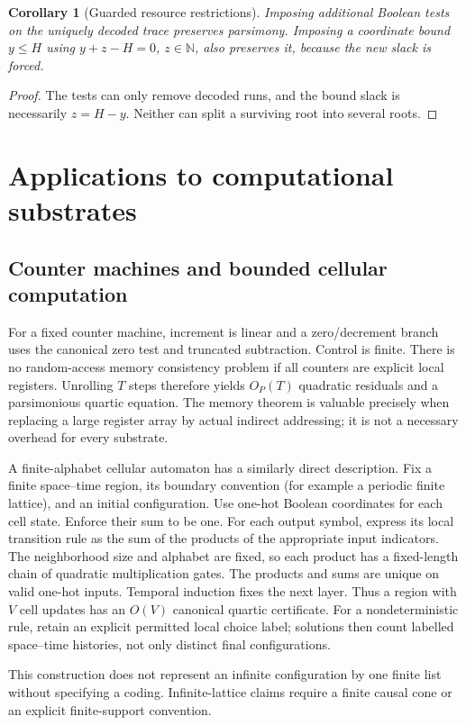 \documentclass[11pt,a4paper]{article}
\newtheorem{corollary}[corollary]{Corollary}
\theoremstyle{definition}
\theoremstyle{remark}
\newcommand{\N}{\mathbb N}
\newcommand{\srctag}[1]{\texorpdfstring{\hspace{0.5em}{\normalfont\small\color{accent}[#1]}}{ [#1]}}
\begin{document}
\begin{corollary}[Guarded resource restrictions]
Imposing additional Boolean tests on the uniquely decoded trace preserves
parsimony. Imposing a coordinate bound $y\leq H$ using
$y+z-H=0$, $z\in\N$, also preserves it, because the new slack is forced.
\end{corollary}
\begin{proof}
The tests can only remove decoded runs, and the bound slack is necessarily
$z=H-y$. Neither can split a surviving root into several roots.
\end{proof}

\section{Applications to computational substrates\srctag{03}}\label{cdc:mem:sec:substrates}
\subsection{Counter machines and bounded cellular computation}
For a fixed counter machine, increment is linear and a zero/decrement branch
uses the canonical zero test and truncated subtraction. Control is finite.
There is no random-access memory consistency problem if all counters are
explicit local registers. Unrolling $T$ steps therefore yields $O_P(T)$
quadratic residuals and a parsimonious quartic equation. The memory theorem is
valuable precisely when replacing a large register array by actual indirect
addressing; it is not a necessary overhead for every substrate.

A finite-alphabet cellular automaton has a similarly direct description. Fix a
finite space--time region, its boundary convention (for example a periodic
finite lattice), and an initial configuration. Use one-hot Boolean coordinates
for each cell state. Enforce their sum to be one. For each output symbol,
express its local transition rule as the sum of the products of the appropriate
input indicators. The neighborhood size and alphabet are fixed, so each product
has a fixed-length chain of quadratic multiplication gates. The products and
sums are unique on valid one-hot inputs. Temporal induction fixes the next
layer. Thus a region with $V$ cell updates has an $O(V)$ canonical quartic
certificate. For a nondeterministic rule, retain an explicit permitted local
choice label; solutions then count labelled space--time histories, not only
distinct final configurations.

This construction does not represent an infinite configuration by one finite
list without specifying a coding. Infinite-lattice claims require a finite
causal cone or an explicit finite-support convention.
\end{document}
